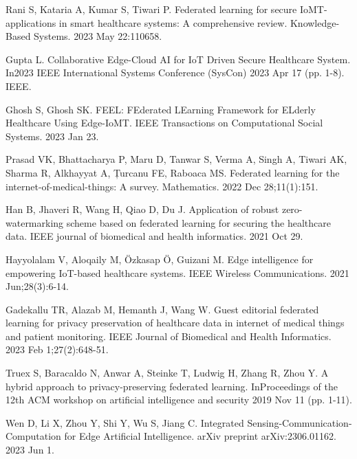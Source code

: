 \documentclass[conference]{IEEEtran}
\begin{document}
\begin{thebibliography}{1}
Rani S, Kataria A, Kumar S, Tiwari P. Federated learning for secure IoMT-applications in smart healthcare systems: A comprehensive review. Knowledge-Based Systems. 2023 May 22:110658.

Gupta L. Collaborative Edge-Cloud AI for IoT Driven Secure Healthcare System. In2023 IEEE International Systems Conference (SysCon) 2023 Apr 17 (pp. 1-8). IEEE.

Ghosh S, Ghosh SK. FEEL: FEderated LEarning Framework for ELderly Healthcare Using Edge-IoMT. IEEE Transactions on Computational Social Systems. 2023 Jan 23.

Prasad VK, Bhattacharya P, Maru D, Tanwar S, Verma A, Singh A, Tiwari AK, Sharma R, Alkhayyat A, Țurcanu FE, Raboaca MS. Federated learning for the internet-of-medical-things: A survey. Mathematics. 2022 Dec 28;11(1):151.

Han B, Jhaveri R, Wang H, Qiao D, Du J. Application of robust zero-watermarking scheme based on federated learning for securing the healthcare data. IEEE journal of biomedical and health informatics. 2021 Oct 29.

Hayyolalam V, Aloqaily M, Özkasap Ö, Guizani M. Edge intelligence for empowering IoT-based healthcare systems. IEEE Wireless Communications. 2021 Jun;28(3):6-14.

Gadekallu TR, Alazab M, Hemanth J, Wang W. Guest editorial federated learning for privacy preservation of healthcare data in internet of medical things and patient monitoring. IEEE Journal of Biomedical and Health Informatics. 2023 Feb 1;27(2):648-51.

Truex S, Baracaldo N, Anwar A, Steinke T, Ludwig H, Zhang R, Zhou Y. A hybrid approach to privacy-preserving federated learning. InProceedings of the 12th ACM workshop on artificial intelligence and security 2019 Nov 11 (pp. 1-11).

Wen D, Li X, Zhou Y, Shi Y, Wu S, Jiang C. Integrated Sensing-Communication-Computation for Edge Artificial Intelligence. arXiv preprint arXiv:2306.01162. 2023 Jun 1.

\end{thebibliography}
\end{document}
